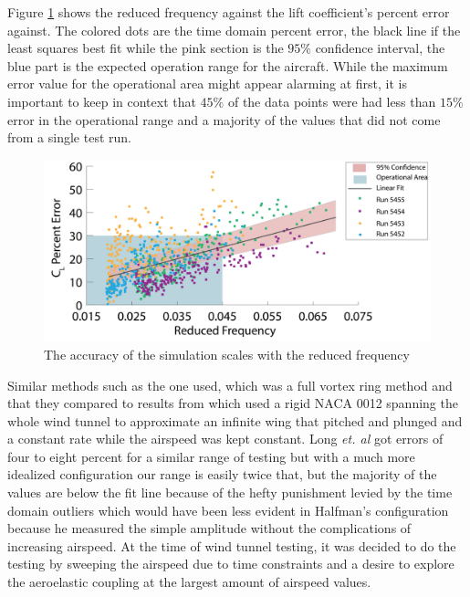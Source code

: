 \documentclass[11pt]{ucthesis}
\begin{document}
Figure \ref{fig:RFreqvCLEr} shows the reduced frequency against the lift coefficient's percent error against. The colored dots are the time domain percent error, the black line if the least squares best fit while the pink section is the $95\%$ confidence interval, the blue part is the expected operation range for the aircraft. While the maximum error value for the operational area might appear alarming at first, it is important to keep in context that $45\%$ of the data points were had less than $15\%$ error in the operational range and a majority of the values that did not come from a single test run. 
\begin{figure}[thpb]
\centering
\includegraphics[width=.75\linewidth]{Figures/ReducedFreqvCLPError-01.png}
\caption{The accuracy of the simulation scales with the reduced frequency}
\label{fig:RFreqvCLEr}
\end{figure}
Similar methods such as the one \cite{long2004object} used, which was a full vortex ring method and that they compared to results from \cite{halfman1952experimental} which used a rigid NACA 0012 spanning the whole wind tunnel to approximate an infinite wing that pitched and plunged and a constant rate while the airspeed was kept constant. Long {\it et. al} got errors of four to eight percent for a similar range of testing but with a much more idealized configuration our range is easily twice that, but the majority of the values are below the fit line because of the hefty punishment levied by the time domain outliers which would have been less evident in Halfman's configuration because he measured the simple amplitude without the complications of increasing airspeed. At the time of wind tunnel testing, it was decided to do the testing by sweeping the airspeed due to time constraints and a desire to explore the aeroelastic coupling at the largest amount of airspeed values.
\end{document}
